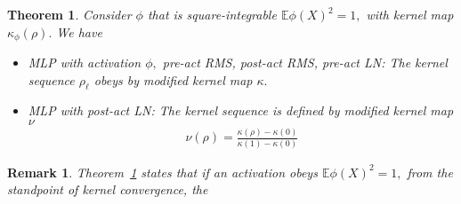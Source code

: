 \documentclass[twoside]{article}
\newcommand{\E}{\mathbb{E}}
\newtheorem{theorem}{Theorem}
\newtheorem{remark}{Remark}
\theoremstyle{definition}
\begin{document}
\begin{theorem}
\label{thm:global_attract_norm}
Consider $\phi$ that is square-integrable $\E \phi(X)^2 =1,$ with kernel map $\kappa_\phi(\rho).$ We have 
\begin{itemize}
\item MLP with activation $\phi,$ pre-act RMS, post-act RMS, pre-act LN: The kernel sequence $\rho_\ell$ obeys by modified  kernel map $\kappa.$ 
\item MLP with post-act LN: The kernel sequence is defined by modified  kernel map $\nu$ 
\begin{align*}
    \nu(\rho) = \frac{\kappa(\rho)-\kappa(0)}{\kappa(1)-\kappa(0)}
\end{align*}
\end{itemize}
\end{theorem}

\begin{remark}
    Theorem~\ref{thm:global_attract_norm} states that if an activation obeys $\E \phi(X)^2 =1,$ from the standpoint of kernel convergence, the 
\end{remark}
\end{document}
